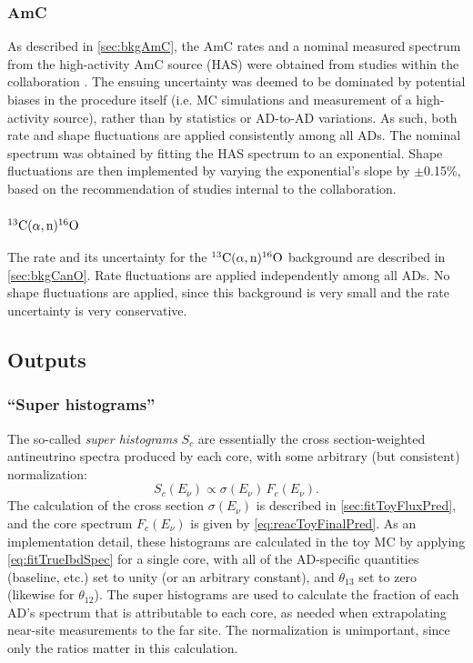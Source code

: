 \documentclass[../thesis.tex]{subfiles}
\begin{document}
\subsubsection{AmC}

As described in \autoref{sec:bkgAmC}, the AmC rates and a nominal measured spectrum from the high-activity AmC source (HAS) were obtained from studies within the collaboration \cite{AmC_paper}. The ensuing uncertainty was deemed to be dominated by potential biases in the procedure itself (i.e. MC simulations and measurement of a high-activity source), rather than by statistics or AD-to-AD variations. As such, both rate and shape fluctuations are applied consistently among all ADs. The nominal spectrum was obtained by fitting the HAS spectrum to an exponential. Shape fluctuations are then implemented by varying the exponential's slope by $\pm$0.15\%, based on the recommendation of studies internal to the collaboration.

\subsubsection{$^{13}\mathrm{C}(\alpha, \mathrm{n})^{16}\mathrm{O}$}

The rate and its uncertainty for the $^{13}\mathrm{C}(\alpha, \mathrm{n})^{16}\mathrm{O}$ background are described in \autoref{sec:bkgCanO}. Rate fluctuations are applied independently among all ADs. No shape fluctuations are applied, since this background is very small and the rate uncertainty is very conservative.

\subsection{Outputs}
\label{sec:fitToyOutputs}

\subsubsection{``Super histograms''}

The so-called \emph{super histograms} $S_c$ are essentially the cross section-weighted antineutrino spectra produced by each core, with some arbitrary (but consistent) normalization:
\begin{equation}
  S_c(E_\nu) \propto \sigma(E_\nu)\,F_c(E_\nu).
\end{equation}
The calculation of the cross section $\sigma(E_\nu)$ is described in \autoref{sec:fitToyFluxPred}, and the core spectrum $F_c(E_\nu)$ is given by \autoref{eq:reacToyFinalPred}. As an implementation detail, these histograms are calculated in the toy MC by applying \autoref{eq:fitTrueIbdSpec} for a single core, with all of the AD-specific quantities (baseline, etc.) set to unity (or an arbitrary constant), and $\theta_{13}$ set to zero (likewise for $\theta_{12}$). The super histograms are used to calculate the fraction of each AD's spectrum that is attributable to each core, as needed when extrapolating near-site measurements to the far site. The normalization is unimportant, since only the ratios matter in this calculation.
\end{document}
